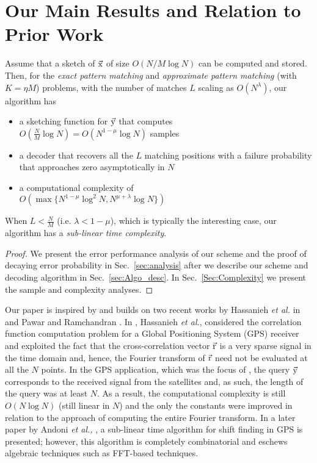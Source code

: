 \section{Our Main Results and Relation to Prior Work}
\label{sec:mainresults}
\begin{theorem}
Assume that a sketch of $\vec{\mathrm{x}}$ of size $O(N/M \log N)$ can be computed and stored. Then, for the {\it exact pattern matching} and {\it approximate pattern matching} (with $K = \eta M$) problems, with the number of matches $L$ scaling as $O(N^{\lambda})$, our algorithm has
\begin{itemize}
 \item a sketching function for $\vec{\mathrm{y}}$ that computes \\ $O(\frac{N}{M}\log N)$$= O\left(N^{1-\mu}\log N\right)$ samples
 \item a decoder that recovers all the $L$ matching positions with a failure probability that approaches zero asymptotically in $N$
 \item a computational complexity of \\$O\left(\max\{N^{1-\mu}\log^2 N, N^{\mu+\lambda}\log N \}\right)$
 \end{itemize}
When $L<\frac{N}{M}$ (i.e. $\lambda<1-\mu$), which is typically the interesting case, our algorithm has a {\it sub-linear time complexity}.
\end{theorem}
\begin{proof}
We present the error performance analysis of our scheme and the proof of decaying error probability in Sec.~\ref{sec:analysis} after we describe our scheme and  decoding algorithm in Sec.~\ref{sec:Algo_desc}. In Sec.~\ref{Sec:Complexity} we present the sample and complexity analyses.
\end{proof}
Our paper is inspired by and builds on two recent works by Hassanieh {\em {et al.}} in \cite{hassanieh2012faster} and Pawar and Ramchandran \cite{pawar2014robust}. In \cite{hassanieh2012faster}, Hassanieh \emph{et al.}, considered the correlation function computation problem for a Global Positioning System (GPS) receiver and exploited the fact that the cross-correlation vector $\vec{\mathrm{r}}$ is a very sparse signal in the time domain and, hence, the Fourier transform of $\vec{\mathrm{r}}$ need not be evaluated at all the $N$ points. In the GPS application, which was the focus of \cite{hassanieh2012faster}, the query $\vec{\mathrm{y}}$ corresponds to the received signal from the satellites and, as such, the length of the query was at least $N$. As a result, the computational complexity is still $O(N \log N)$ (still linear in $N$) and the only the constants were improved in relation to the approach of computing the entire Fourier transform. In a later paper by Andoni {\em et al.,} \cite{andoni2013shift}, a sub-linear time algorithm for shift finding in GPS is presented; however, this algorithm is completely combinatorial and eschews algebraic techniques such as FFT-based techniques.

